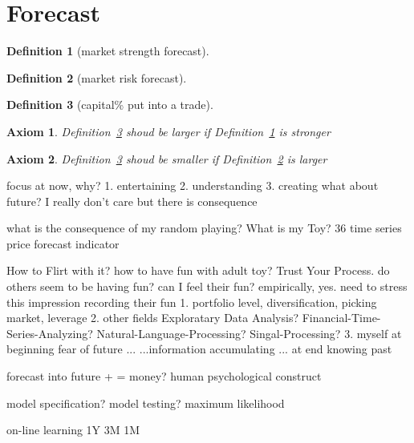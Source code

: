 \documentclass{article}
\newtheorem{definition}{Definition}[section]
\newtheorem{axiom}{Axiom}[section]
\begin{document}
\section{Forecast}
\begin{definition}[market strength forecast]
    \label{msf}
\end{definition}
\begin{definition}[market risk forecast]
    \label{mrf}
\end{definition}
\begin{definition}[capital\% put into a trade]
    \label{cpit}
\end{definition}
\begin{axiom}
    Definition~\ref{cpit} shoud be larger if Definition~\ref{msf} is stronger
\end{axiom}
\begin{axiom}
    Definition~\ref{cpit} shoud be smaller if Definition~\ref{mrf} is larger
\end{axiom}


focus at now, why?
1. entertaining
2. understanding
3. creating
what about future? I really don't care
but there is consequence

what is the consequence of my random playing?
What is my Toy?
    36 time series
        price
        forecast
        indicator

 How to Flirt with it? how to have fun with adult toy? Trust Your Process.
    do others seem to be having fun? can I feel their fun? empirically, yes.
        need to stress this impression
        recording their fun
        1. portfolio level, diversification, picking market, leverage
        2. other fields
            Exploratary Data Analysis?
            Financial-Time-Series-Analyzing?
            Natural-Language-Processing?
            Singal-Processing?
        3. myself
            at beginning fear of future
            ...
            ...information accumulating
            ...
            at end knowing past

forecast into future +  = money?
human psychological construct

model specification?
model testing? maximum likelihood


on-line learning
    1Y
    3M
    1M
\end{document}
